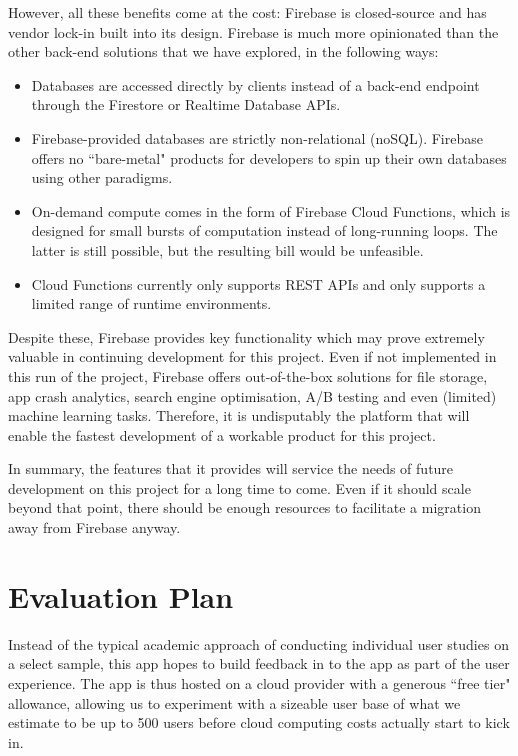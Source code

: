 However, all these benefits come at the cost: Firebase is closed-source and has vendor lock-in built into its design. Firebase is much more opinionated than the other back-end solutions that we have explored, in the following ways:

\begin{itemize}
    \item Databases are accessed directly by clients instead of a back-end endpoint through the Firestore or Realtime Database APIs.
    \item Firebase-provided databases are strictly non-relational (noSQL). Firebase offers no ``bare-metal" products for developers to spin up their own databases using other paradigms.
    \item On-demand compute comes in the form of Firebase Cloud Functions, which is designed for small bursts of computation instead of long-running loops. The latter is still possible, but the resulting bill would be unfeasible.
    \item Cloud Functions currently only supports REST APIs and only supports a limited range of runtime environments.
\end{itemize}

Despite these, Firebase provides key functionality which may prove extremely valuable in continuing development for this project. Even if not implemented in this run of the project, Firebase offers out-of-the-box solutions for file storage, app crash analytics, search engine optimisation, A/B testing and even (limited) machine learning tasks. Therefore, it is undisputably the platform that will enable the fastest development of a workable product for this project.

In summary, the features that it provides will service the needs of future development on this project for a long time to come. Even if it should scale beyond that point, there should be enough resources to facilitate a migration away from Firebase anyway.

\section{Evaluation Plan}
Instead of the typical academic approach of conducting individual user studies on a select sample, this app hopes to build feedback in to the app as part of the user experience. The app is thus hosted on a cloud provider with a generous ``free tier" allowance, allowing us to experiment with a sizeable user base of what we estimate to be up to 500 users before cloud computing costs actually start to kick in.

